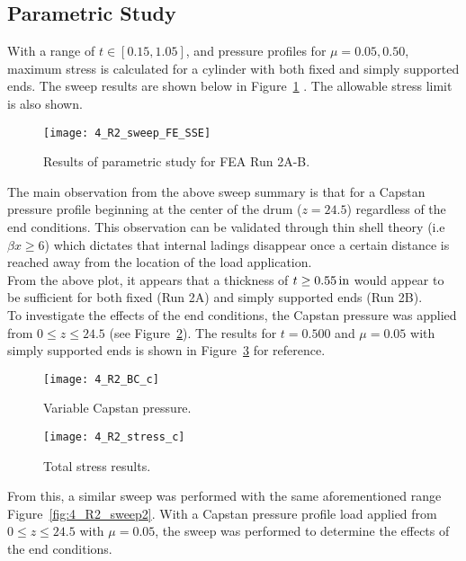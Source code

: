 \subsection{Parametric Study}

With a range of $t\in [0.15, 1.05]$, and pressure profiles for $\mu =0.05, 0.50$, maximum stress is calculated for a cylinder with both fixed and simply supported ends. The sweep results are shown below in Figure~\ref{fig:4_R2_sweep} \cite{EXCEL}.  The allowable stress limit is also shown.

\begin{figure}[H]
	\centering
	\texttt{[image: 4\_R2\_sweep\_FE\_SSE]}
	\caption{Results of parametric study for FEA Run 2A-B.}
	\label{fig:4_R2_sweep}
\end{figure}

The main observation from the above sweep summary is that for a Capstan pressure profile beginning at the center of the drum ($z=24.5$) regardless of the end conditions. This observation can be validated through thin shell theory (i.e $\beta x \geq 6$) which dictates that internal ladings disappear once a certain distance is reached away from the location of the load application.\\

From the above plot, it appears that a thickness of $t \geq 0.55 \,\mathrm{in}$ would appear to be sufficient for both fixed (Run 2A) and simply supported ends (Run 2B).\\

To investigate the effects of the end conditions, the Capstan pressure was applied from $0 \leq z \leq 24.5$ (see Figure~\ref{fig:4_R2_BC_c}). The results for $t=0.500$ and $\mu=0.05$ with simply supported ends is shown in Figure~\ref{fig:4_R2_stress_c} for reference.
\begin{figure}[H]
	\centering
	\texttt{[image: 4\_R2\_BC\_c]}
	\caption{Variable Capstan pressure.}
	\label{fig:4_R2_BC_c}
\end{figure}

\begin{figure}[H]
	\centering
	\texttt{[image: 4\_R2\_stress\_c]}
	\caption{Total stress results.}
	\label{fig:4_R2_stress_c}
\end{figure}

From this, a similar sweep was performed with the same aforementioned range Figure~\ref{fig:4_R2_sweep2}. With a Capstan pressure profile load applied from $0 \leq z \leq 24.5$ with $\mu=0.05$, the sweep was performed to determine the effects of the end conditions.

